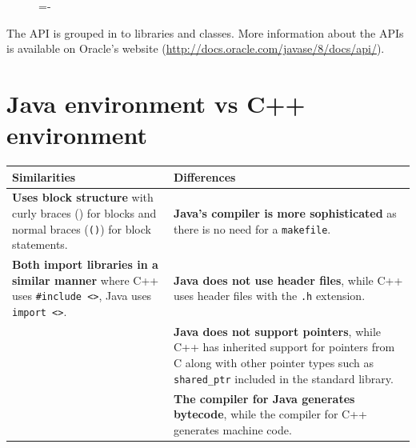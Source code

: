 \documentclass[a4paper]{systems-software}
\begin{document}
\begin{figure}[H]
  \lineskip=-\fboxrule
\end{figure}

The API is grouped in to libraries and classes. More information about the APIs is available on Oracle's website (\url{http://docs.oracle.com/javase/8/docs/api/}). 


\section*{Java environment vs C++ environment}

\begin{longtabu} to \textwidth {| X[1,l] | X[1,l] |}
    \hline
    \textbf{Similarities} & \textbf{Differences}
	\\ \hline
	\textbf{Uses block structure} with curly braces (\texttt{\string{ \string}}) for blocks and normal braces (\texttt{()}) for block statements. &
	\textbf{Java's compiler is more sophisticated} as there is no need for a \texttt{makefile}.
	\\ \hline
	\textbf{Both import libraries in a similar manner} where C++ uses \texttt{\#include <>}, Java uses \texttt{import <>}. &
	\textbf{Java does not use header files}, while C++ uses header files with the \texttt{.h} extension.
	\\ \hline
	& \textbf{Java does not support pointers}, while C++ has inherited support for pointers from C along with other pointer types such as \texttt{shared\_ptr} included in the standard library.
	\\ \hline
	& \textbf{The compiler for Java generates bytecode}, while the compiler for C++ generates machine code.
	\\ \hline
\end{longtabu}
\end{document}
